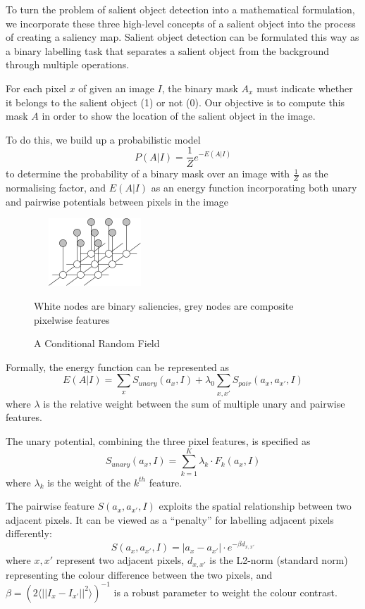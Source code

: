 \documentclass[10pt,twocolumn,letterpaper]{article}
\newcommand{\SUM}{\sum\limits}
\begin{document}
To turn the problem of salient object detection into a mathematical formulation, we incorporate these three high-level concepts of a salient object into the process of creating a saliency map.  Salient object detection can be formulated this way as a binary labelling task that separates a salient object from the background through multiple operations.

For each pixel $x$ of given an image $I$, the binary mask $A_x$ must indicate whether it belongs to the salient object (1) or not (0). Our objective is to compute this mask $A$ in order to show the location of the salient object in the image.

To do this, we build up a probabilistic model $$P(A|I)=\frac{1}{Z}e^{-E(A|I)}$$ to determine the probability of a binary mask over an image with $\frac{1}{Z}$ as the normalising factor, and $E(A|I)$ as an energy function incorporating both unary and pairwise potentials between pixels in the image

\begin{figure}[h]
    \begin{center}
        \includegraphics[width=1.8in,height=1in]{./Figures/mrf.jpg} \\
        \caption{A Conditional Random Field }
        \small White nodes are binary saliencies, grey nodes are composite pixelwise features
        \end{center}
\end{figure}

Formally, the energy function can be represented as $$E(A|I) = \SUM_x S_{unary}(a_x,I) + \lambda_0 \SUM_{x,x'}S_{pair}(a_x,a_{x'},I)$$ where $\lambda$ is the relative weight between the sum of multiple unary  and pairwise features. 

The unary potential, combining the three pixel features, is specified as $$S_{unary}(a_x,I) = \SUM_{k=1}^K \lambda_k \cdot F_k(a_x,I)$$ where $\lambda_k$ is the  weight of the $k^{th}$ feature. %

The pairwise feature $S(a_x,a_{x'},I)$ exploits the spatial relationship between two adjacent pixels.  It can be viewed as a ``penalty'' for labelling adjacent pixels differently: $$S(a_x,a_{x'},I) = |a_x-a_{x'}| \cdot e^{-\beta d_{x,x'}}$$ where $x,x'$ represent two adjacent pixels, $d_{x,x'}$ is the L2-norm (standard norm) representing the colour difference between the two pixels, and $\beta=(2\langle||I_x-I_{x'}||^2\rangle)^{-1}$ is a robust parameter to weight the colour contrast.
\end{document}
